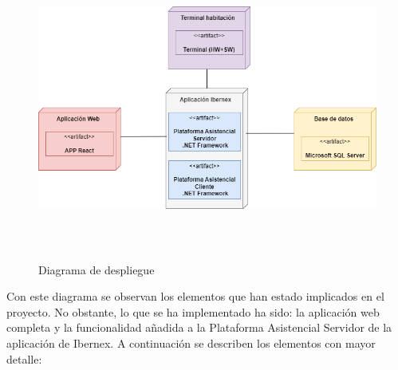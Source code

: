 \begin{figure}[!h]
    \centering
    \includegraphics[width=1\textwidth,height=10cm]{Imagenes/Arquitectura-despliegue}
    \caption{Diagrama de despliegue}
    \label{fig:despliegue}
\end{figure}

Con este diagrama se observan los elementos que han estado implicados en el proyecto. No obstante, lo que se ha implementado ha sido: la aplicación web completa y la funcionalidad añadida a la Plataforma Asistencial Servidor de la aplicación de Ibernex. A continuación se describen los elementos con mayor detalle:


